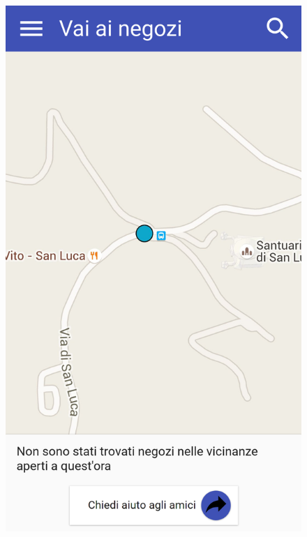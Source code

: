 \begin{figure}[H]
	\begin{minipage}{.49\textwidth}
		\includegraphics[width=\textwidth]{img/wireframe/mappa_negozi_chiusi.png}
	\end{minipage}
	\begin{minipage}{.49\textwidth}

\end{minipage}
\end{figure}
